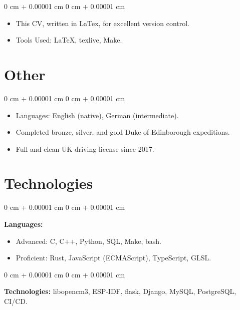 \documentclass[10pt, letterpaper]{article}
\newenvironment{highlights}{
    \begin{itemize}[
        topsep=0.10 cm,
        parsep=0.10 cm,
        partopsep=0pt,
        itemsep=0pt,
        leftmargin=0 cm + 10pt
    ]
}{
    \end{itemize}
}
\newenvironment{onecolentry}{
    \begin{adjustwidth}{
        0 cm + 0.00001 cm
    }{
        0 cm + 0.00001 cm
    }
}{
    \end{adjustwidth}
}
\begin{document}
        \vspace{0.10 cm}
        \begin{onecolentry}
            \begin{highlights}
                \item This CV, written in LaTex, for excellent version control.
                \item Tools Used: LaTeX, texlive, Make.
            \end{highlights}
        \end{onecolentry}
    
    \section{Other}

        \begin{onecolentry}
            \begin{highlights}
                \item Languages: English (native), German (intermediate).
                \item Completed bronze, silver, and gold Duke of Edinborough expeditions.
                \item Full and clean UK driving license since 2017.
            \end{highlights}
        \end{onecolentry}

    \section{Technologies}
        
        \begin{onecolentry}
            \textbf{Languages:}
            \begin{highlights}
                \item Advanced: C, C++, Python, SQL, Make, bash.
                \item Proficient: Rust, JavaScript (ECMAScript), TypeScript, GLSL.
            \end{highlights}
        \end{onecolentry}

        \vspace{0.2 cm}
 
        \begin{onecolentry}
            \textbf{Technologies:} libopencm3, ESP-IDF, flask, Django, MySQL, PostgreSQL, CI/CD.
        \end{onecolentry}


    
\end{document}
